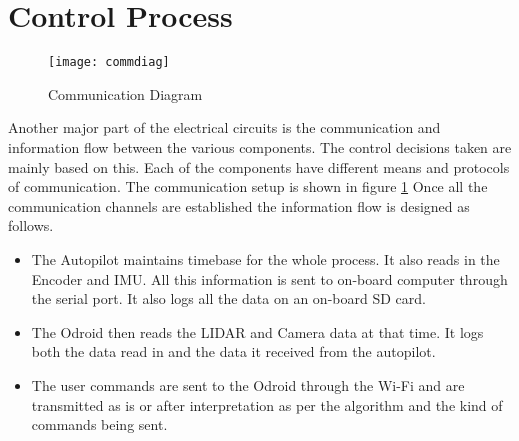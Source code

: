 \section{Control Process}
\begin{figure}[h]
\centering
\texttt{[image: commdiag]}
\caption{Communication Diagram}
\label{fig: CommDiag}
\end{figure}
Another major part of the electrical circuits is the communication and information flow between the various components. The control decisions taken are mainly based on this. Each of the components have different means and protocols of communication. The communication setup is shown in figure \ref{fig: CommDiag} Once all the communication channels are established the information flow is designed as follows.
\begin{itemize}
	\item The Autopilot maintains timebase for the whole process. It also reads in the Encoder and IMU. All this information is sent to on-board computer through the serial port. It also logs all the data on an on-board SD card.
	\item The Odroid then reads the LIDAR and Camera data at that time. It logs both the data read in and the data it received from the autopilot. 
	\item The user commands are sent to the Odroid through the Wi-Fi and are transmitted as is or after interpretation as per the algorithm and the kind of commands being sent. 
\end{itemize}

